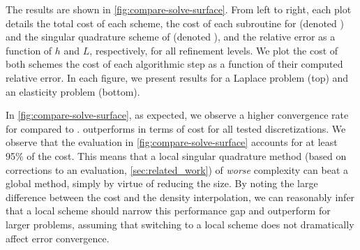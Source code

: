 The results are shown in \cref{fig:compare-solve-surface}. 
From left to right, each plot details the total cost of each scheme, the cost of each subroutine for \qbkix (denoted ) and the singular quadrature scheme of \cite{YBZ} (denoted ), and the relative error as a function of $h$ and $L$, respectively, 
for all refinement levels. 
We plot the cost of both schemes the cost of each algorithmic step as a function of their computed relative error. 
In each figure, we present results for a Laplace problem (top) and an elasticity problem (bottom). %

In \cref{fig:compare-solve-surface}, as expected, we observe a  higher  convergence rate for \qbkix compared to \cite{YBZ}. 
\cite{YBZ} outperforms \qbkix in terms of cost for all tested discretizations.  
 We observe that the \fmm evaluation in \cref{fig:compare-solve-surface} accounts for at least 95\% of the \qbkix cost.
This means that a local singular quadrature method (based on corrections to an \fmm evaluation, \cref{sec:related_work}) of \textit{worse} complexity can beat a global method, simply by virtue of reducing the \fmm size.
By noting the large difference between the \qbkix \fmm cost and the \qbkix density interpolation, we can reasonably infer that a local \qbkix scheme should narrow this  performance gap and outperform \cite{YBZ} for larger problems, assuming that switching to a local scheme does not dramatically affect error convergence. 


